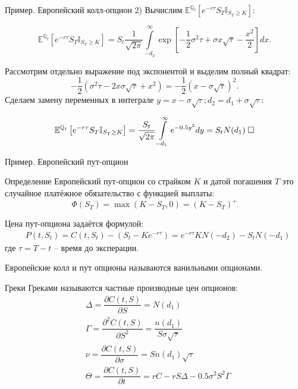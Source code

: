 \documentclass[aspectratio=169]{beamer}
\newcommand*{\QEDB}{\null\nobreak\hfill\ensuremath{\square}}
\begin{document}
\begin{frame}{Пример. Европейский колл-опцион}
    2) Вычислим $\mathbb{E}^{\mathbb{Q}_t}\left[e^{-r\tau} S_T \mathbb{I}_{S_T \geq K}\right]$:

    $$
        \mathbb{E}^{\mathbb{Q}_t}\left[e^{-r\tau} S_T \mathbb{I}_{S_T \geq K}\right]  
    = S_t \dfrac{1}{\sqrt{2\pi}}\int\limits_{-d_2}^{\infty} \exp\left[-\dfrac{1}{2} \sigma^2\tau + \sigma x \sqrt{\tau}-\frac{x^2}{2} \right]dx.
    $$

    Рассмотрим отдельно выражение под экспонентой и выделим полный квадрат:
    $$
        -\dfrac{1}{2}\left(\sigma^2 \tau - 2x\sigma \sqrt{\tau} + x^2 \right) = -\dfrac{1}{2} \left(x-\sigma \sqrt{\tau} \right)^2.
    $$
    Сделаем замену переменных в интеграле 
    $y = x - \sigma \sqrt{\tau}; d_2 = d_1 + \sigma \sqrt{\tau}$:

    $$
        \mathbb{E}^{\mathbb{Q}_t}\left[e^{-r\tau} S_T \mathbb{I}_{S_T \geq K}\right]  
    = \dfrac{S_t}{\sqrt{2\pi}}\int\limits_{-d_1}^{\infty} e^{-0.5y^2}dy
     = S_t N(d_1) \; \QEDB
    $$    
\end{frame}

\begin{frame}{Пример. Европейский пут-опцион}
    \begin{block}{Определение}
        Европейский пут-опцион со страйком $K$ и датой погашения $T$ это случайное платёжное обязательство с функцией выплаты:
        $$\Phi(S_T) = \max(K-S_T, 0) = (K-S_T)^+$$
    \end{block}
    Цена пут-опциона задаётся формулой:
    \begin{align*}
        &P(t, S_t) = C(t, S_t) - \left( S_t - K e^{-r\tau}\right)
        = e^{-r\tau} K N(-d_2) - S_t N(-d_1)
    \end{align*}где $\tau=T-t$ -- время до эксперации.

    Европейские колл и пут опционы называются ванильными опционами.
\end{frame}

\begin{frame}{Греки}
    Греками называются частные производные цен опционов:
    \begin{align*}
        &\Delta = \dfrac{\partial C(t, S)}{\partial S} = N(d_1) \\
        &\Gamma = \dfrac{\partial^2 C(t, S)}{\partial S^2} = \dfrac{n(d_1)}{S\sigma \sqrt{\tau}}\\
        &\nu = \dfrac{\partial C(t, S)}{\partial \sigma} = S n(d_1)\sqrt{\tau}\\
        &\Theta = \dfrac{\partial C(t, S)}{\partial t} = rC - r S \Delta - 0.5 \sigma^2 S^2 \Gamma
    \end{align*}
\end{frame}
\end{document}
